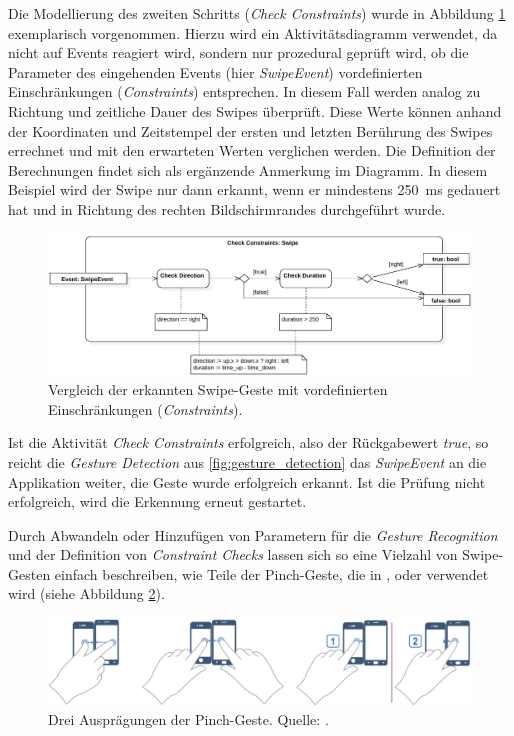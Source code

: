Die Modellierung des zweiten Schritts (\textit{Check Constraints}) wurde in Abbildung \ref{fig:check_swipe_constraints} exemplarisch vorgenommen. Hierzu wird ein Aktivitätsdiagramm verwendet, da nicht auf Events reagiert wird, sondern nur prozedural geprüft wird, ob die Parameter des eingehenden Events (hier \textit{SwipeEvent}) vordefinierten Einschränkungen (\textit{Constraints}) entsprechen. In diesem Fall werden analog zu \citep{Hinckley2004} Richtung und zeitliche Dauer des Swipes überprüft. Diese Werte können anhand der Koordinaten und Zeitstempel der ersten und letzten Berührung des Swipes errechnet und mit den erwarteten Werten verglichen werden. Die Definition der Berechnungen findet sich als ergänzende Anmerkung im Diagramm.
In diesem Beispiel wird der Swipe nur dann erkannt, wenn er mindestens \SI{250}{\milli\second} gedauert hat und in Richtung des rechten Bildschirmrandes durchgeführt wurde.
\begin{figure}[h]
\centering
\includegraphics[width=1\textwidth]{bilder/check_swipe_constraints.pdf}
\caption{Vergleich der erkannten Swipe-Geste mit vordefinierten Einschränkungen (\textit{Constraints}).}
\label{fig:check_swipe_constraints}
\end{figure}

Ist die Aktivität \textit{Check Constraints} erfolgreich, also der Rückgabewert \textit{true}, so reicht die \textit{Gesture Detection} aus \ref{fig:gesture_detection} das \textit{SwipeEvent} an die Applikation weiter, die Geste wurde erfolgreich erkannt. Ist die Prüfung nicht erfolgreich, wird die Erkennung erneut gestartet. 

Durch Abwandeln oder Hinzufügen von Parametern für die \textit{Gesture Recognition} und der Definition von \textit{Constraint Checks} lassen sich so eine Vielzahl von Swipe-Gesten einfach beschreiben, wie \zb Teile der Pinch-Geste, die in \citep{Lucero2011}, \citep{Chen2014} oder \citep{Nielsen2014} verwendet wird (siehe Abbildung \ref{fig:pinch}).
\begin{figure}
\centering
\includegraphics[width=1\textwidth]{bilder/pinch.png}
\caption{Drei Ausprägungen der Pinch-Geste. Quelle: \citep{Nielsen2014}.}
\label{fig:pinch}
\end{figure}

